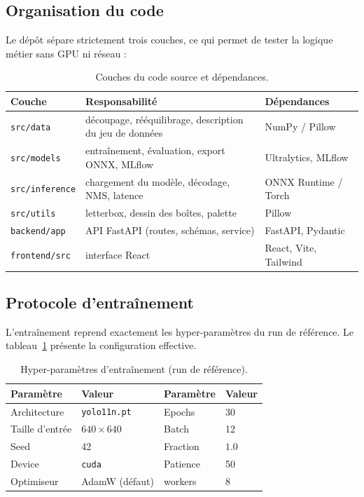 \documentclass[11pt,a4paper]{article}
\begin{document}
\subsection{Organisation du code}

Le dépôt sépare strictement trois couches, ce qui permet de tester la
logique métier sans GPU ni réseau :

\begin{table}[H]
\centering
\caption{Couches du code source et dépendances.}
\begin{tabular}{@{}p{2.9cm}p{5.9cm}p{4.9cm}@{}}
\toprule
\textbf{Couche} & \textbf{Responsabilité} & \textbf{Dépendances} \\
\midrule
\texttt{src/data} & découpage, rééquilibrage, description du jeu de données & NumPy / Pillow \\
\texttt{src/models} & entraînement, évaluation, export ONNX, MLflow & Ultralytics, MLflow \\
\texttt{src/inference} & chargement du modèle, décodage, NMS, latence & ONNX Runtime / Torch \\
\texttt{src/utils} & letterbox, dessin des boîtes, palette & Pillow \\
\texttt{backend/app} & API FastAPI (routes, schémas, service) & FastAPI, Pydantic \\
\texttt{frontend/src} & interface React & React, Vite, Tailwind \\
\bottomrule
\end{tabular}
\end{table}

\subsection{Protocole d'entraînement}

L'entraînement reprend exactement les hyper-paramètres du run de référence.
Le tableau~\ref{tab:hyper} présente la configuration effective.

\begin{table}[H]
\centering
\caption{Hyper-paramètres d'entraînement (run de référence).}
\label{tab:hyper}
\begin{tabular}{@{}p{2.6cm}p{4.6cm}p{2.6cm}p{4.6cm}@{}}
\toprule
\textbf{Paramètre} & \textbf{Valeur} & \textbf{Paramètre} & \textbf{Valeur} \\
\midrule
Architecture   & \texttt{yolo11n.pt}  & Epochs         & 30 \\
Taille d'entrée & \(640 \times 640\) & Batch          & 12 \\
Seed            & 42                 & Fraction       & \(1.0\) \\
Device          & \texttt{cuda}       & Patience       & 50 \\
Optimiseur      & AdamW (défaut)     & workers        & 8 \\
\bottomrule
\end{tabular}
\end{table}
\end{document}
